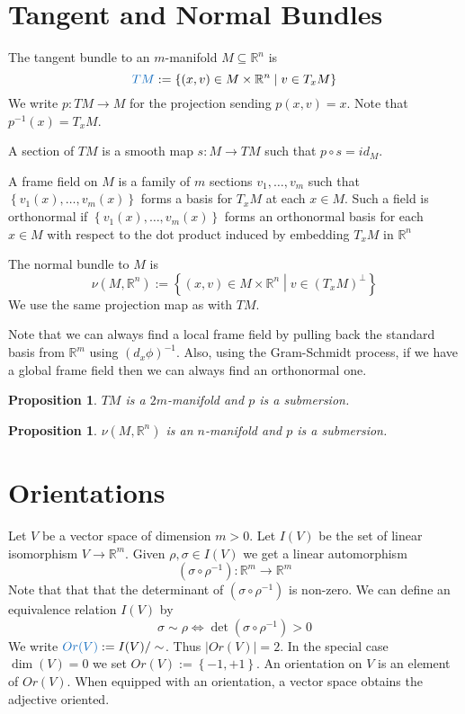 \documentclass[11pt]{article}
\newcommand{\defeq}{:=}
\newcommand{\abs}[1]{|#1|}
\newcommand{\relmiddle}[1]{\mathrel{}\middle#1\mathrel{}}
\newcommand{\rmv}{\relmiddle|}
\newcommand{\R}{\mathbb{R}}
\newenvironment{defin}
	{\begin{mdframed}[backgroundcolor=white, roundcorner=5pt, linewidth=1pt, linecolor=RoyalBlue]
		\setlength{\parindent}{0pt}}
	{\end{mdframed}}
\newcommand{\mdf}[1]{{\color{RoyalBlue} #1}}
\newtheorem{prop}[theorem]{Proposition}
\begin{document}
\section{Tangent and Normal Bundles}

\begin{defin}
	The \mdf{tangent bundle} to an $m$-manifold $M\subseteq\R^n$ is
	\[
		\mdf{TM}\defeq \left\{ (x, v)\in M\times \R^n \rmv v \in T_xM\right\}
	\]
	We write $p:TM \to M$ for the projection sending $p(x, v)=x$.
	Note that $p^{-1}(x)=T_xM$.

	A \mdf{section} of $TM$ is a smooth map $s:M \to TM$ such that $p\circ s = id_M$.

	A \mdf{frame field} on $M$ is a family of $m$ sections $v_1, \dots , v_m $ such that $\left\{ v_1(x), \dots , v_m(x)\right\}$ forms a basis for $T_xM$ at each $x\in M$.
	Such a field is \mdf{orthonormal} if $\left\{ v_1(x) , \dots, v_m(x)\right\}$ forms an orthonormal basis for each $x\in M$ with respect to the dot product induced by embedding $T_xM$ in $\R^n$

	The \mdf{normal bundle} to $M$  is
	\[
		\nu(M , \R^n) \defeq \left\{ (x, v) \in M\times \R^n \rmv v \in (T_xM)^\perp\right\}
	\]
	We use the same projection map as with $TM$.
\end{defin}

Note that we can always find a local frame field by pulling back the standard basis from $\R^m$ using $(d_x\phi)^{-1}$.
Also, using the Gram-Schmidt process, if we have a global frame field then we can always find an orthonormal one.

\begin{prop}
$TM$ is a $2m$-manifold and $p$ is a submersion.
\end{prop}

\begin{prop}
$\nu(M, \R^n)$ is an $n$-manifold and $p$ is a submersion.
\end{prop}

\section{Orientations}
Let $V$ be a vector space of dimension $m> 0$.
Let $I(V)$ be the set of linear isomorphism $V\to \R^m$.
Given $\rho, \sigma \in I(V)$ we get a linear automorphism
\[
	(\sigma \circ \rho^{-1}) : \R^m \to \R^m
\]
Note that that that the determinant of $(\sigma \circ \rho^{-1})$ is non-zero.
We can define an equivalence relation $I(V)$ by
\[
	\sigma \sim \rho \iff \det(\sigma\circ \rho^{-1}) > 0
\]
We write $\mdf{Or(V)}\defeq I(V)/\sim$.
Thus $\abs{Or(V)}=2$.
In the special case $\dim (V) = 0$ we set $Or(V)\defeq \left\{ -1, +1\right\}$.
An \mdf{orientation} on $V$ is an element of $Or(V)$.
When equipped with an orientation, a vector space obtains the adjective \mdf{oriented}.
\end{document}
